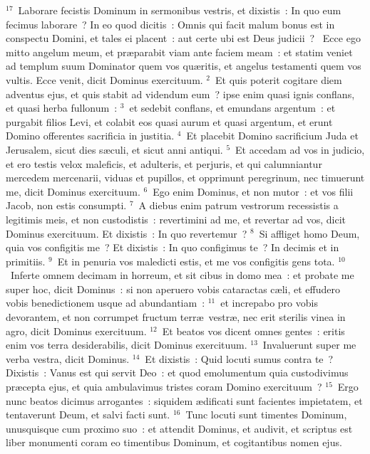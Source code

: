 ${}^{17}$~Laborare fecistis Dominum in sermonibus vestris, et dixistis~: In quo eum fecimus laborare~? In eo quod dicitis~: Omnis qui facit malum bonus est in conspectu Domini, et tales ei placent~: aut certe ubi est Deus judicii~?
~\lettrine[lines=10,image=true,loversize=0.05,lraise=-0.03]{E}{}cce ego mitto angelum meum, et pr\ae parabit viam ante faciem meam~: et statim veniet ad templum suum Dominator quem vos qu\ae ritis, et angelus testamenti quem vos vultis. Ecce venit, dicit Dominus exercituum.
${}^{2}$~Et quis poterit cogitare diem adventus ejus, et quis stabit ad videndum eum~? ipse enim quasi ignis conflans, et quasi herba fullonum~:
${}^{3}$~et sedebit conflans, et emundans argentum~: et purgabit filios Levi, et colabit eos quasi aurum et quasi argentum, et erunt Domino offerentes sacrificia in justitia.
${}^{4}$~Et placebit Domino sacrificium Juda et Jerusalem, sicut dies s\ae culi, et sicut anni antiqui.
${}^{5}$~Et accedam ad vos in judicio, et ero testis velox maleficis, et adulteris, et perjuris, et qui calumniantur mercedem mercenarii, viduas et pupillos, et opprimunt peregrinum, nec timuerunt me, dicit Dominus exercituum.
${}^{6}$~Ego enim Dominus, et non mutor~: et vos filii Jacob, non estis consumpti.
${}^{7}$~A diebus enim patrum vestrorum recessistis a legitimis meis, et non custodistis~: revertimini ad me, et revertar ad vos, dicit Dominus exercituum. Et dixistis~: In quo revertemur~?
${}^{8}$~Si affliget homo Deum, quia vos configitis me~? Et dixistis~: In quo configimus te~? In decimis et in primitiis.
${}^{9}$~Et in penuria vos maledicti estis, et me vos configitis gens tota.
${}^{10}$~Inferte omnem decimam in horreum, et sit cibus in domo mea~: et probate me super hoc, dicit Dominus~: si non aperuero vobis cataractas c\ae li, et effudero vobis benedictionem usque ad abundantiam~:
${}^{11}$~et increpabo pro vobis devorantem, et non corrumpet fructum terr\ae\ vestr\ae , nec erit sterilis vinea in agro, dicit Dominus exercituum.
${}^{12}$~Et beatos vos dicent omnes gentes~: eritis enim vos terra desiderabilis, dicit Dominus exercituum.
${}^{13}$~Invaluerunt super me verba vestra, dicit Dominus.
${}^{14}$~Et dixistis~: Quid locuti sumus contra te~? Dixistis~: Vanus est qui servit Deo~: et quod emolumentum quia custodivimus pr\ae cepta ejus, et quia ambulavimus tristes coram Domino exercituum~?
${}^{15}$~Ergo nunc beatos dicimus arrogantes~: siquidem \ae dificati sunt facientes impietatem, et tentaverunt Deum, et salvi facti sunt.
${}^{16}$~Tunc locuti sunt timentes Dominum, unusquisque cum proximo suo~: et attendit Dominus, et audivit, et scriptus est liber monumenti coram eo timentibus Dominum, et cogitantibus nomen ejus.
